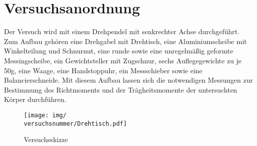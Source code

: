 \section{Versuchsanordnung}
    Der Versuch wird mit einem Drehpendel mit senkrechter Achse durchgeführt. Zum Aufbau gehören eine Drehgabel mit Drehtisch, eine Aluminiumscheibe mit Winkelteilung und Schnurnut, eine runde sowie eine unregelmäßig geformte Messingscheibe, ein Gewichtsteller mit Zugschnur, sechs Auflegegewichte zu je 50g, eine Waage, eine Handstoppuhr, ein Messschieber sowie eine Balancierschneide. Mit diesem Aufbau lassen sich die notwendigen Messungen zur Bestimmung des Richtmoments und der Trägheitsmomente der untersuchten Körper durchführen.

\begin{figure}[h!]
    \centering
    \texttt{[image: img/\\versuchsnummer/Drehtisch.pdf]}
    \caption{Versuchsskizze}
    \label{fig:drehtisch}
\end{figure}